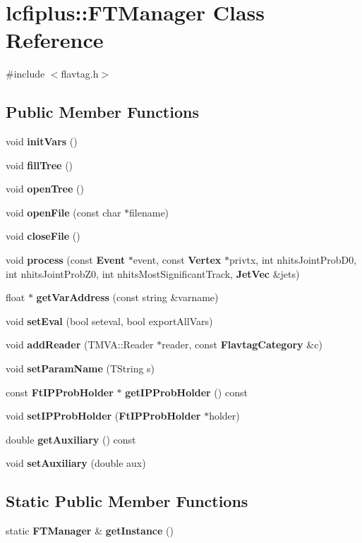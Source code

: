 \section{lcfiplus\-:\-:F\-T\-Manager Class Reference}
\label{classlcfiplus_1_1FTManager}


{\ttfamily \#include $<$flavtag.\-h$>$}

\subsection*{Public Member Functions}
\begin{DoxyCompactItemize}
\item 
void {\bf init\-Vars} ()
\item 
void {\bf fill\-Tree} ()
\item 
void {\bf open\-Tree} ()
\item 
void {\bf open\-File} (const char $\ast$filename)
\item 
void {\bf close\-File} ()
\item 
void {\bf process} (const {\bf Event} $\ast$event, const {\bf Vertex} $\ast$privtx, int nhits\-Joint\-Prob\-D0, int nhits\-Joint\-Prob\-Z0, int nhits\-Most\-Significant\-Track, {\bf Jet\-Vec} \&jets)
\item 
float $\ast$ {\bf get\-Var\-Address} (const string \&varname)
\item 
void {\bf set\-Eval} (bool seteval, bool export\-All\-Vars)
\item 
void {\bf add\-Reader} (T\-M\-V\-A\-::\-Reader $\ast$reader, const {\bf Flavtag\-Category} \&c)
\item 
void {\bf set\-Param\-Name} (T\-String s)
\item 
const {\bf Ft\-I\-P\-Prob\-Holder} $\ast$ {\bf get\-I\-P\-Prob\-Holder} () const 
\item 
void {\bf set\-I\-P\-Prob\-Holder} ({\bf Ft\-I\-P\-Prob\-Holder} $\ast$holder)
\item 
double {\bf get\-Auxiliary} () const 
\item 
void {\bf set\-Auxiliary} (double aux)
\end{DoxyCompactItemize}
\subsection*{Static Public Member Functions}
\begin{DoxyCompactItemize}
\item 
static {\bf F\-T\-Manager} \& {\bf get\-Instance} ()
\end{DoxyCompactItemize}


